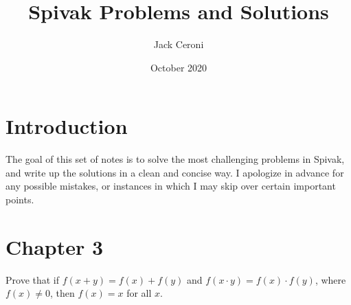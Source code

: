 \documentclass[10pt, oneside]{article}
\title{Spivak Problems and Solutions}
\author{Jack Ceroni}
\date{October 2020}
\newenvironment{problem}[2][Problem]{\begin{trivlist}
\item[\hskip \labelsep {\bfseries #1}\hskip \labelsep {\bfseries #2.}]}{\end{trivlist}}
\begin{document}
    \maketitle
    \tableofcontents

    \vspace{.25in}

    \section{Introduction}

    The goal of this set of notes is to solve the most challenging problems in Spivak, and
    write up the solutions in a clean and concise way. I apologize in advance for any
    possible mistakes, or instances in which I may skip over certain important points.

    \newpage

    \section{Chapter 3}

    \begin{problem}{3.17}
      Prove that if $f(x + y) = f(x) + f(y)$ and $f(x \cdot y) = f(x) \cdot f(y)$, where $f(x) \neq 0$, then $f(x) = x$ for all $x$.
    \end{problem}
\end{document}

